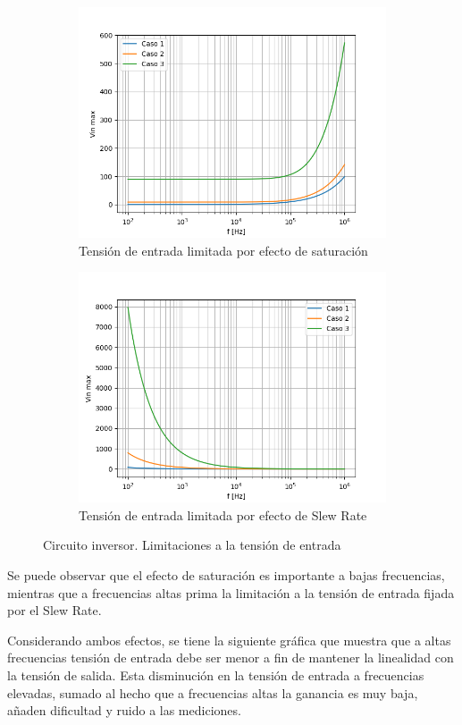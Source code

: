 \begin{figure}[H]
	\begin{subfigure}{.5\textwidth}
	    \centering
		\includegraphics[width=.8\linewidth]{./Imagenes/SatInv.png}  
		\caption{Tensión de entrada limitada por efecto de saturación}
	\end{subfigure}
	\begin{subfigure}{.5\textwidth}
	    \centering
		\includegraphics[width=.8\linewidth]{./Imagenes/SRInv.png}  
		\caption{Tensión de entrada limitada por efecto de Slew Rate}
	\end{subfigure}
	\caption{Circuito inversor. Limitaciones a la tensión de entrada}
	\label{fig:invcasos}
\end{figure} 

Se puede observar que el efecto de saturación es importante a bajas frecuencias, mientras que a frecuencias altas prima la limitación a la tensión de entrada fijada por el Slew Rate.

Considerando ambos efectos, se tiene la siguiente gráfica que muestra que a altas frecuencias tensión de entrada debe ser menor a fin de mantener la linealidad con la tensión de salida. Esta disminución en la tensión de entrada a frecuencias elevadas, sumado al hecho que a frecuencias altas la ganancia es muy baja, añaden dificultad y ruido a las mediciones. 

